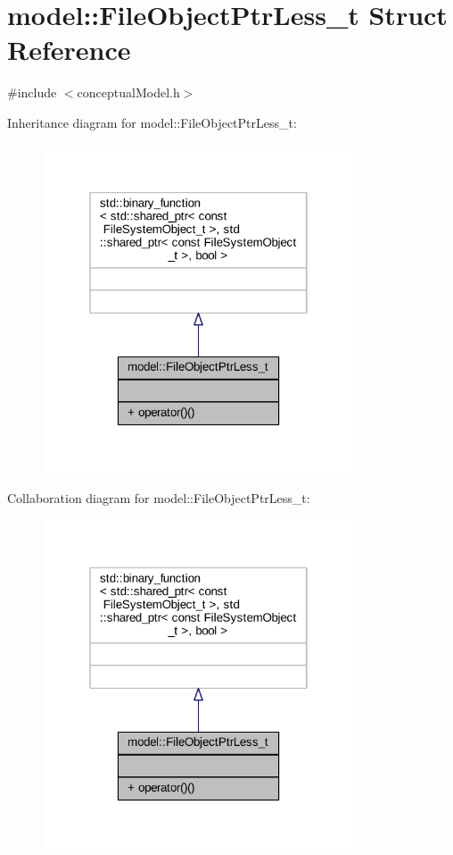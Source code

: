 \hypertarget{structmodel_1_1_file_object_ptr_less__t}{}\section{model\+:\+:File\+Object\+Ptr\+Less\+\_\+t Struct Reference}
\label{structmodel_1_1_file_object_ptr_less__t}


{\ttfamily \#include $<$conceptual\+Model.\+h$>$}



Inheritance diagram for model\+:\+:File\+Object\+Ptr\+Less\+\_\+t\+:
\nopagebreak
\begin{figure}[H]
\begin{center}
\leavevmode
\includegraphics[width=262pt]{structmodel_1_1_file_object_ptr_less__t__inherit__graph}
\end{center}
\end{figure}


Collaboration diagram for model\+:\+:File\+Object\+Ptr\+Less\+\_\+t\+:
\nopagebreak
\begin{figure}[H]
\begin{center}
\leavevmode
\includegraphics[width=262pt]{structmodel_1_1_file_object_ptr_less__t__coll__graph}
\end{center}
\end{figure}
